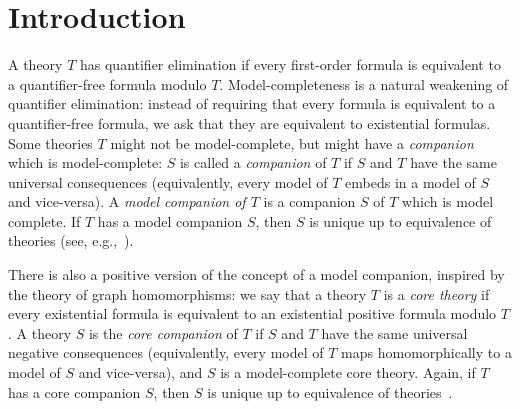 \documentclass{amsart}
\theoremstyle{definition}
\theoremstyle{remark}
\numberwithin{equation}{section}
\newcommand{\bA}{\mathfrak{A}}
\newcommand{\Aut}{\operatorname{Aut}}
\newcommand{\pau}[1]{\textcolor{blue}{#1}}
\begin{document}
\section{Introduction}
A theory $T$ has quantifier elimination if every first-order formula is equivalent to a quantifier-free formula modulo $T$. Model-completeness is a natural weakening of quantifier elimination: instead of requiring that every formula is equivalent to a quantifier-free formula, we ask
that they are equivalent to existential formulas.
Some theories $T$ might not be model-complete, but might have a \emph{companion} which is model-complete: $S$ is called a \emph{companion} of $T$ if $S$ and $T$ 
have 
the same universal consequences
(equivalently, every model of $T$ embeds in a model of $S$ and vice-versa).
A \emph{model companion of $T$} is a companion $S$ of $T$ which is model complete. 
If $T$ has a model companion $S$, then $S$ is unique up to equivalence of theories (see, e.g.,~\cite{HodgesLong}). 

There is also a positive version of the  concept of a model companion, inspired by the theory of graph homomorphisms: 
we say that a theory $T$ is a \emph{core theory} if every existential formula is equivalent to an existential positive formula modulo $T$. A theory $S$ is the \emph{core companion} of $T$ if $S$ and $T$ have the same universal negative consequences (equivalently, every model of $T$ maps homomorphically to a model of $S$ and vice-versa), and $S$ is a model-complete core theory.
Again, if $T$ has a core companion $S$, then $S$ is unique up to equivalence of theories~\cite{BodHilsMartin-Journal}. 
\end{document}
